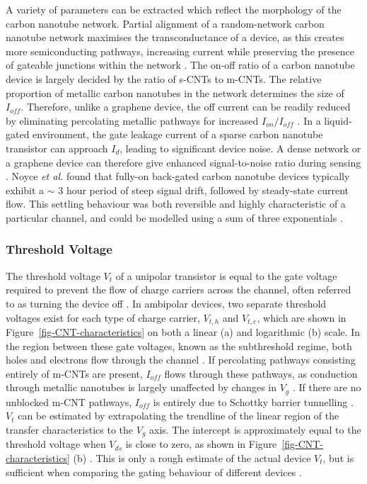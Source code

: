 \documentclass[
  a4paper,
]{scrbook}
\begin{document}
A variety of parameters can be extracted which reflect the morphology of
the carbon nanotube network. Partial alignment of a random-network
carbon nanotube network maximises the transconductance of a device, as
this creates more semiconducting pathways, increasing current while
preserving the presence of gateable junctions within the network
\autocite{Cao2009,Rouhi2010,Rouhi2011a,Jang2015,Li2023}. The on-off
ratio of a carbon nanotube device is largely decided by the ratio of
s-CNTs to m-CNTs. The relative proportion of metallic carbon nanotubes
in the network determines the size of \(I_{off}\). Therefore, unlike a
graphene device, the off current can be readily reduced by eliminating
percolating metallic pathways for increased \(I_{on}/I_{off}\)
\autocite{Hu2004,Cao2009,Rouhi2010,Rouhi2011a}. In a liquid-gated
environment, the gate leakage current of a sparse carbon nanotube
transistor can approach \(I_d\), leading to significant device noise. A
dense network or a graphene device can therefore give enhanced
signal-to-noise ratio during sensing \autocite{Ohno2015}. Noyce \emph{et
al.} found that fully-on back-gated carbon nanotube devices typically
exhibit a \(\sim\) 3 hour period of steep signal drift, followed by
steady-state current flow. This settling behaviour was both reversible
and highly characteristic of a particular channel, and could be modelled
using a sum of three exponentials \autocite{Noyce2019}.

\hypertarget{threshold-voltage}{%
\subsubsection*{Threshold Voltage}\label{threshold-voltage}}

The threshold voltage \(V_t\) of a unipolar transistor is equal to the
gate voltage required to prevent the flow of charge carriers across the
channel, often referred to as turning the device off
\autocite{Petti2016,Shkodra2021}. In ambipolar devices, two separate
threshold voltages exist for each type of charge carrier, \(V_{t,h}\)
and \(V_{t,e}\), which are shown in Figure~\ref{fig-CNT-characteristics}
on both a linear (a) and logarithmic (b) scale. In the region between
these gate voltages, known as the subthreshold regime, both holes and
electrons flow through the channel
\autocite{Avouris2007,Reiner-Rozman2015}. If percolating pathways
consisting entirely of m-CNTs are present, \(I_{off}\) flows through
these pathways, as conduction through metallic nanotubes is largely
unaffected by changes in \(V_g\) \autocite{Fuhrer2000,Topinka2009}. If
there are no unblocked m-CNT pathways, \(I_{off}\) is entirely due to
Schottky barrier tunnelling \autocite{Avouris2007}. \(V_t\) can be
estimated by extrapolating the trendline of the linear region of the
transfer characteristics to the \(V_g\) axis. The intercept is
approximately equal to the threshold voltage when \(V_{ds}\) is close to
zero, as shown in Figure~\ref{fig-CNT-characteristics} (b)
\autocite{Sze2006,Petti2016,Li2023}. This is only a rough estimate of
the actual device \(V_t\), but is sufficient when comparing the gating
behaviour of different devices \autocite{Li2023}.
\end{document}

